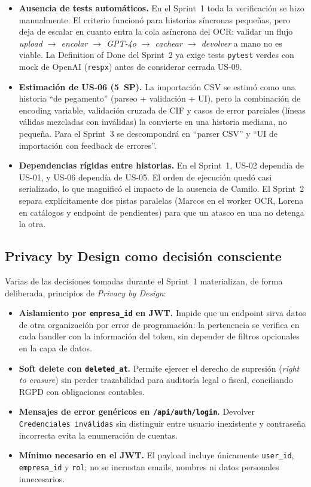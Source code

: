 \begin{itemize}
\item \textbf{Ausencia de tests automáticos.} En el Sprint~1 toda la verificación se hizo manualmente. El criterio funcionó para historias síncronas pequeñas, pero deja de escalar en cuanto entra la cola asíncrona del OCR: validar un flujo \emph{upload $\rightarrow$ encolar $\rightarrow$ GPT-4o $\rightarrow$ cachear $\rightarrow$ devolver} a mano no es viable. La Definition of Done del Sprint~2 ya exige tests \texttt{pytest} verdes con mock de OpenAI (\texttt{respx}) antes de considerar cerrada US-09.
\item \textbf{Estimación de US-06 (5~SP).} La importación CSV se estimó como una historia ``de pegamento'' (parseo + validación + UI), pero la combinación de encoding variable, validación cruzada de CIF y casos de error parciales (líneas válidas mezcladas con inválidas) la convierte en una historia mediana, no pequeña. Para el Sprint~3 se descompondrá en ``parser CSV'' y ``UI de importación con feedback de errores''.
\item \textbf{Dependencias rígidas entre historias.} En el Sprint~1, US-02 dependía de US-01, y US-06 dependía de US-05. El orden de ejecución quedó casi serializado, lo que magnificó el impacto de la ausencia de Camilo. El Sprint~2 separa explícitamente dos pistas paralelas (Marcos en el worker OCR, Lorena en catálogos y endpoint de pendientes) para que un atasco en una no detenga la otra.
\end{itemize}

\subsection{Privacy by Design como decisión consciente}

Varias de las decisiones tomadas durante el Sprint~1 materializan, de forma deliberada, principios de \emph{Privacy by Design}:

\begin{itemize}
\item \textbf{Aislamiento por \texttt{empresa\_id} en JWT.} Impide que un endpoint sirva datos de otra organización por error de programación: la pertenencia se verifica en cada handler con la información del token, sin depender de filtros opcionales en la capa de datos.
\item \textbf{Soft delete con \texttt{deleted\_at}.} Permite ejercer el derecho de supresión (\emph{right to erasure}) sin perder trazabilidad para auditoría legal o fiscal, conciliando RGPD con obligaciones contables.
\item \textbf{Mensajes de error genéricos en \texttt{/api/auth/login}.} Devolver \texttt{Credenciales inválidas} sin distinguir entre usuario inexistente y contraseña incorrecta evita la enumeración de cuentas.
\item \textbf{Mínimo necesario en el JWT.} El payload incluye únicamente \texttt{user\_id}, \texttt{empresa\_id} y \texttt{rol}; no se incrustan emails, nombres ni datos personales innecesarios.
\end{itemize}

